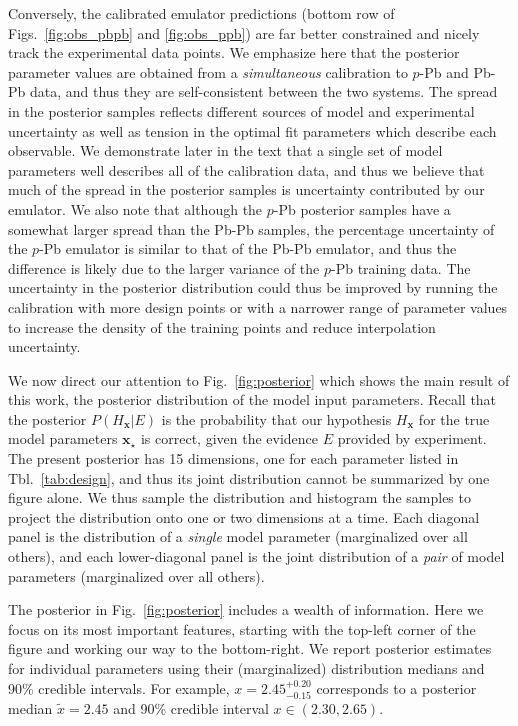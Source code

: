 \documentclass[aps,prc,reprint,amsmath,nofootinbib]{revtex4-1}
\newcommand{\x}{\mathbf{x}}
\begin{document}
Conversely, the calibrated emulator predictions (bottom row of Figs.~\ref{fig:obs_pbpb} and \ref{fig:obs_ppb}) are far better constrained and nicely track the experimental data points.
We emphasize here that the posterior parameter values are obtained from a \emph{simultaneous} calibration to $p$-Pb and Pb-Pb data, and thus they are self-consistent between the two systems.
The spread in the posterior samples reflects different sources of model and experimental uncertainty as well as tension in the optimal fit parameters which describe each observable.
We demonstrate later in the text that a single set of model parameters well describes all of the calibration data, and thus we believe that much of the spread in the posterior samples is uncertainty contributed by our emulator.
We also note that although the $p$-Pb posterior samples have a somewhat larger spread than the Pb-Pb samples, the percentage uncertainty of the $p$-Pb emulator is similar to that of the Pb-Pb emulator, and thus the difference is likely due to the larger variance of the $p$-Pb training data.
The uncertainty in the posterior distribution could thus be improved by running the calibration with more design points or with a narrower range of parameter values to increase the density of the training points and reduce interpolation uncertainty.

We now direct our attention to Fig.~\ref{fig:posterior} which shows the main result of this work, the posterior distribution of the model input parameters.
Recall that the posterior $P(H_\x | E)$ is the probability that our hypothesis $H_\x$ for the true model parameters $\x_\star$ is correct, given the evidence $E$ provided by experiment.
The present posterior has 15 dimensions, one for each parameter listed in Tbl.~\ref{tab:design}, and thus its joint distribution cannot be summarized by one figure alone.
We thus sample the distribution and histogram the samples to project the distribution onto one or two dimensions at a time.
Each diagonal panel is the distribution of a \emph{single} model parameter (marginalized over all others), and each lower-diagonal panel is the joint distribution of a \emph{pair} of model parameters (marginalized over all others).

The posterior in Fig.~\ref{fig:posterior} includes a wealth of information.
Here we focus on its most important features, starting with the top-left corner of the figure and working our way to the bottom-right.
We report posterior estimates for individual parameters using their (marginalized) distribution medians and 90\% credible intervals.
For example, $x=2.45_{-0.15}^{+0.20}$ corresponds to a posterior median $\tilde{x}=2.45$ and 90\% credible interval $x \in (2.30, 2.65)$.
\end{document}
